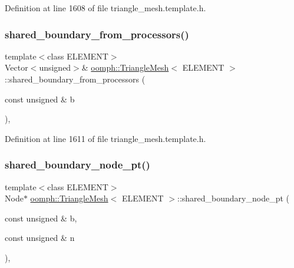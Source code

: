 Definition at line 1608 of file triangle\+\_\+mesh.\+template.\+h.

\mbox{\label{classoomph_1_1TriangleMesh_a8b2a688aa766adadf29ecc4394a192b8}} 
\subsubsection{\texorpdfstring{shared\+\_\+boundary\+\_\+from\+\_\+processors()}{shared\_boundary\_from\_processors()}\hspace{0.1cm}{\footnotesize\ttfamily [2/2]}}
{\footnotesize\ttfamily template$<$class E\+L\+E\+M\+E\+NT$>$ \\
Vector$<$unsigned$>$\& \hyperlink{classoomph_1_1TriangleMesh}{oomph\+::\+Triangle\+Mesh}$<$ E\+L\+E\+M\+E\+NT $>$\+::shared\+\_\+boundary\+\_\+from\+\_\+processors (\begin{DoxyParamCaption}\item[{const unsigned \&}]{b }\end{DoxyParamCaption})\hspace{0.3cm}{\ttfamily [inline]}, {\ttfamily [protected]}}



Definition at line 1611 of file triangle\+\_\+mesh.\+template.\+h.

\mbox{\label{classoomph_1_1TriangleMesh_a9605f96f76e7f00b3e0f8130e5118029}} 
\subsubsection{\texorpdfstring{shared\+\_\+boundary\+\_\+node\+\_\+pt()}{shared\_boundary\_node\_pt()}}
{\footnotesize\ttfamily template$<$class E\+L\+E\+M\+E\+NT$>$ \\
Node$\ast$ \hyperlink{classoomph_1_1TriangleMesh}{oomph\+::\+Triangle\+Mesh}$<$ E\+L\+E\+M\+E\+NT $>$\+::shared\+\_\+boundary\+\_\+node\+\_\+pt (\begin{DoxyParamCaption}\item[{const unsigned \&}]{b,  }\item[{const unsigned \&}]{n }\end{DoxyParamCaption})\hspace{0.3cm}{\ttfamily [inline]}, {\ttfamily [protected]}}



